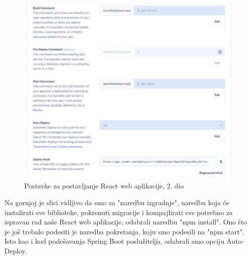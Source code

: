 			\begin{figure}[H]
			\includegraphics[scale=0.4]{slike/Render_FRONTEND_2.JPG} %
			\centering
			\caption{Postavke za postavljanje React web aplikacije, 2. dio}
			\label{Postavke za postavljanje React web aplikacije, 2. dio}
		\end{figure}
		
		Na gornjoj je slici vidljivo da smo za "naredbu izgradnje", naredbu koja će instalirati sve biblioteke, pokrenuti migracije i kompajlirati sve potrebno za ispravan rad naše React web aplikacije, odabrali naredbu "npm install".
		Ono što je još trebalo podesiti je naredba pokretanja, koju smo podesili na "npm start".
		Isto kao i kod podešavanja Spring Boot poslužitelja, odabrali smo opciju Auto-Deploy.
	
		
	
	
	
		
		
		
		
		
		
		
		
		 
		
		
	    
	    
		
		
		
		
		
		
		
			
			\eject 